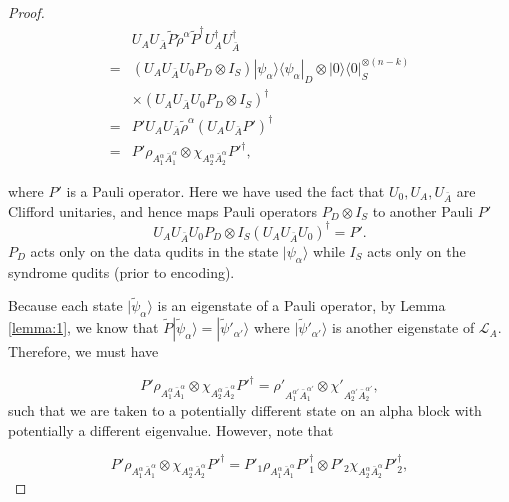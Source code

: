 \documentclass[%
 reprint,
superscriptaddress,
nofootinbib,
 amsmath,amssymb,
 aps,
prx,
floatfix,
]{revtex4-2}
\theoremstyle{definition}
\numberwithin{equation}{section}
\begin{document}
\begin{proof}
\begin{align*}
    &U_A U_{\bar{A}}\tilde{P}\tilde{\rho}^{\alpha}\tilde{P}^{\dagger} U_A^{\dagger}U_{\bar{A}}^{\dagger}\\
    = &(U_A U_{\bar{A}} U_0 P_{D}\otimes I_{S}) |\psi_{\alpha}\rangle\langle\psi_{\alpha}|_D\otimes |0\rangle\langle 0|^{\otimes (n-k)}_S  \\
    &\times(U_A U_{\bar{A}} U_0 P_{D}\otimes I_{S})^{\dagger}\\
    = &P' U_A U_{\bar{A}}\tilde{\rho}^{\alpha} ( U_A U_{\bar{A}} P')^{\dagger}\\
    = &P' \rho_{A_1^{\alpha}\bar{A}_1^{\alpha}} \otimes \chi_{A_2^{\alpha} \bar{A}_2^{\alpha}} P'^{\dagger},
\end{align*}

where $P'$ is a Pauli operator. Here we have used the fact that $U_0,U_A,U_{\bar{A}}$ are Clifford unitaries, and hence maps Pauli operators $P_{D}\otimes I_{S}$ to another Pauli $P'$
$$U_AU_{\bar{A}} U_0 P_{D}\otimes I_{S}(U_AU_{\bar{A}} U_0)^{\dagger} = P'.$$
$P_{D}$ acts only on the data qudits in the state $|\psi_{\alpha}\rangle$ while $I_{S}$ acts only on the syndrome qudits (prior to encoding).

 
 Because each state $|\tilde{\psi}_{\alpha}\rangle$ is an eigenstate of a Pauli operator, by Lemma \ref{lemma:1}, we know that $\tilde{P}|\tilde{\psi}_{\alpha}\rangle=|\tilde{\psi}'_{\alpha'}\rangle$ where $|\tilde{\psi}'_{\alpha'}\rangle$ is another eigenstate of $\mathcal{L}_A$. Therefore, we must have 
 
 \begin{equation}
     P' \rho_{A_1^{\alpha}\bar{A}_1^{\alpha}} \otimes \chi_{A_2^{\alpha} \bar{A}_2^{\alpha}} P'^{\dagger} = \rho'_{A_1^{\alpha'}\bar{A}_1^{\alpha'}}\otimes \chi'_{A_2^{\alpha'}\bar{A}_2^{\alpha'}},
     \label{eqn:Pprime}
 \end{equation}
 such that we are taken to a potentially different state on an alpha block with potentially a different eigenvalue. However, note that 
 
 $$P'\rho_{A_1^{\alpha}\bar{A}_1^{\alpha}}\otimes \chi_{A_2^{\alpha}\bar{A}_2^{\alpha}} P'^{\dagger} = P'_1\rho_{A_1^{\alpha}\bar{A}_1^{\alpha}}P'^{\dagger}_1\otimes P'_2 \chi_{A_2^{\alpha}\bar{A}_2^{\alpha}} P'^{\dagger}_2,$$
 

\end{proof}
\end{document}
